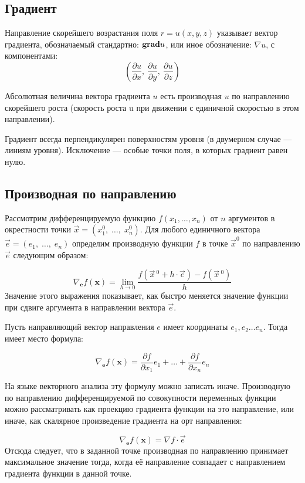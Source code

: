 \subsection{Градиент}

Направление скорейшего возрастания поля $r=u(x,y,z)$ указывает вектор градиента, обозначаемый стандартно:
$\mathbf{grad}\space u$,
или иное обозначение:
$\nabla u$,
с компонентами:
$$\left({\frac  {\partial u}{\partial x}},\ {\frac  {\partial u}{\partial y}},\ {\frac  {\partial u}{\partial z}}\right)$$

Абсолютная величина вектора градиента $u$ есть производная $u$ по направлению скорейшего роста (скорость роста u при движении с единичной скоростью в этом направлении).

Градиент всегда перпендикулярен поверхностям уровня (в двумерном случае — линиям уровня). Исключение — особые точки поля, в которых градиент равен нулю.

\subsection{Производная по направлению}

Рассмотрим дифференцируемую функцию $f(x_{1},\ldots ,x_{n})$ от $n$ аргументов в окрестности точки $\vec {x}=(x_{1}^{0},\;\ldots ,\;x_{n}^{0})$.
 Для любого единичного вектора $\vec {e}=(e_{1},\;\ldots ,\;e_{n})$ определим производную функции
 $f$ в точке $\vec  {x}^{0}$ по направлению $\vec{e}$ следующим образом:

$$ \nabla _{\mathbf {e} }{f}(\mathbf {x} )=\lim _{h\to 0}{\frac {f({\vec {x}}{\,}^{0}+h\cdot {\vec {e}})-f({\vec {x}}{\,}^{0})}{h}}$$
Значение этого выражения показывает, как быстро меняется значение функции при сдвиге аргумента в направлении вектора $\vec{e}$.

Пусть направляющий вектор направления $e$ имеет координаты $e_{1},e_{2}\dots e_{n}$. Тогда имеет место формула:

$$ \nabla _{\mathbf {e} }{f}(\mathbf {x} )={\frac {\partial f}{\partial x_{1}}}e_{1}+\dots +{\frac {\partial f}{\partial x_{n}}}e_{n}$$

На языке векторного анализа эту формулу можно записать иначе. Производную по направлению дифференцируемой по совокупности переменных функции можно рассматривать как проекцию градиента функции на это направление, или иначе, как скалярное произведение градиента на орт направления:

$$\nabla _{\mathbf {e} }{f}(\mathbf {x} )=\nabla f\cdot {\vec {e}}$$
Отсюда следует, что в заданной точке производная по направлению принимает максимальное значение тогда, когда её направление совпадает с направлением градиента функции в данной точке.
